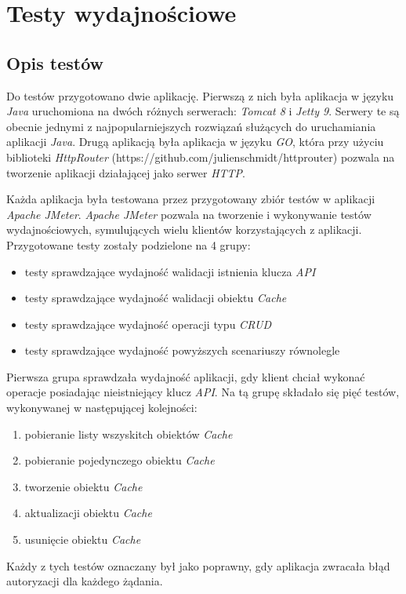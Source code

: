 \chapter{Testy wydajnościowe}
\section{Opis testów}

Do testów przygotowano dwie aplikację. Pierwszą z nich była aplikacja w języku \textsl{Java} uruchomiona na dwóch różnych serwerach: \textsl{Tomcat 8} i \textsl{Jetty 9}. Serwery te są obecnie jednymi z najpopularniejszych rozwiązań służących do uruchamiania aplikacji \textsl{Java}.  Drugą aplikacją była aplikacja w języku \textsl{GO}, która przy użyciu biblioteki \textsl{HttpRouter} (https://github.com/julienschmidt/httprouter) pozwala na tworzenie aplikacji działającej jako serwer \textsl{HTTP}.

Każda aplikacja była testowana przez przygotowany zbiór testów w aplikacji \textsl{Apache JMeter}. \textsl{Apache JMeter} pozwala na tworzenie i wykonywanie testów wydajnościowych, symulujących wielu klientów korzystających z aplikacji. Przygotowane testy zostały podzielone na 4 grupy:
\begin{itemize}
    \item testy sprawdzające wydajność walidacji istnienia klucza \textsl{API}
    \item testy sprawdzające wydajność walidacji obiektu \textsl{Cache}
    \item testy sprawdzające wydajność operacji typu \textsl{CRUD}
    \item testy sprawdzające wydajność powyższych scenariuszy równolegle
\end{itemize}

Pierwsza grupa sprawdzała wydajność aplikacji, gdy klient chciał wykonać operacje posiadając nieistniejący klucz \textsl{API}. Na tą grupę składało się pięć testów, wykonywanej w następującej kolejności:
\begin{enumerate}
    \item pobieranie listy wszyskitch obiektów \textsl{Cache}
    \item pobieranie pojedynczego obiektu \textsl{Cache}
    \item tworzenie obiektu \textsl{Cache}
    \item aktualizacji obiektu \textsl{Cache} 
    \item usunięcie obiektu \textsl{Cache}
\end{enumerate}
Każdy z tych testów oznaczany był jako poprawny, gdy aplikacja zwracała błąd autoryzacji dla każdego żądania.


